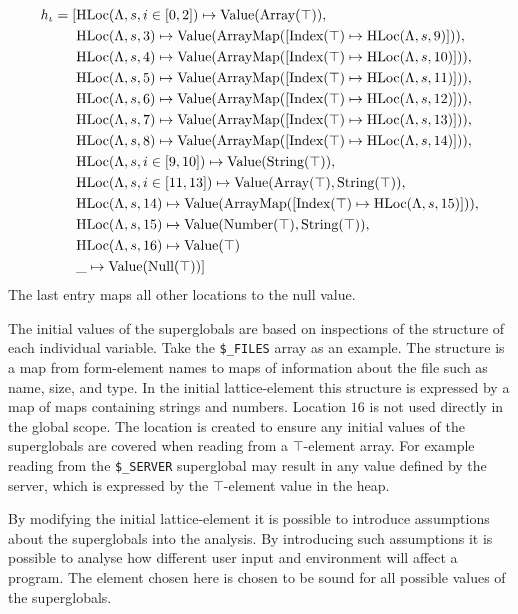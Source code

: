 \begin{align*}
h_\iota = [	&\text{HLoc}(\Lambda, s, i\in[0,2])\mapsto \text{Value}(\text{Array}(\top)),\notag\\
			&\text{HLoc}(\Lambda, s, 3)\mapsto \text{Value}(\text{ArrayMap}([\text{Index}(\top)\mapsto\text{HLoc}(\Lambda, s, 9)])),\notag\\
			&\text{HLoc}(\Lambda, s, 4)\mapsto \text{Value}(\text{ArrayMap}([\text{Index}(\top)\mapsto\text{HLoc}(\Lambda, s, 10)])),\notag\\
			&\text{HLoc}(\Lambda, s, 5)\mapsto \text{Value}(\text{ArrayMap}([\text{Index}(\top)\mapsto\text{HLoc}(\Lambda, s, 11)])),\notag\\			
			&\text{HLoc}(\Lambda, s, 6)\mapsto \text{Value}(\text{ArrayMap}([\text{Index}(\top)\mapsto\text{HLoc}(\Lambda, s, 12)])),\notag\\			
			&\text{HLoc}(\Lambda, s, 7)\mapsto \text{Value}(\text{ArrayMap}([\text{Index}(\top)\mapsto\text{HLoc}(\Lambda, s, 13)])),\notag\\			
			&\text{HLoc}(\Lambda, s, 8)\mapsto \text{Value}(\text{ArrayMap}([\text{Index}(\top)\mapsto\text{HLoc}(\Lambda, s, 14)])),\notag\\			
			&\text{HLoc}(\Lambda, s, i \in [9, 10])\mapsto \text{Value}(\text{String}(\top)),\notag\\
			&\text{HLoc}(\Lambda, s, i\in[11,13])\mapsto \text{Value}(\text{Array}(\top),\text{String}(\top)),\notag\\
			&\text{HLoc}(\Lambda, s, 14)\mapsto \text{Value}(\text{ArrayMap}([\text{Index}(\top)\mapsto\text{HLoc}(\Lambda, s, 15)])),\notag\\			
			&\text{HLoc}(\Lambda, s, 15)\mapsto \text{Value}(\text{Number}(\top),\text{String}(\top)),\notag\\
			&\text{HLoc}(\Lambda, s, 16)\mapsto \text{Value}(\top)\notag\\
			&\_ \mapsto \text{Value}(\text{Null}(\top))]
\end{align*}
The last entry maps all other locations to the null value.

The initial values of the superglobals are based on inspections of the structure of each individual variable. Take the \texttt{\$\_FILES} array as an example. The structure is a map from form-element names to maps of information about the file such as name, size, and type. In the initial lattice-element this structure is expressed by a map of maps containing strings and numbers.  Location $16$ is not used directly in the global scope. The location is created to ensure any initial values of the superglobals are covered when reading from a $\top$-element array. For example reading from the \texttt{\$\_SERVER} superglobal may result in any value defined by the server, which is expressed by the $\top$-element value in the heap. 

By modifying the initial lattice-element it is possible to introduce assumptions about the superglobals into the analysis. By introducing such assumptions it is possible to analyse how different user input and environment will affect a program. The element chosen here is chosen to be sound for all possible values of the superglobals.

